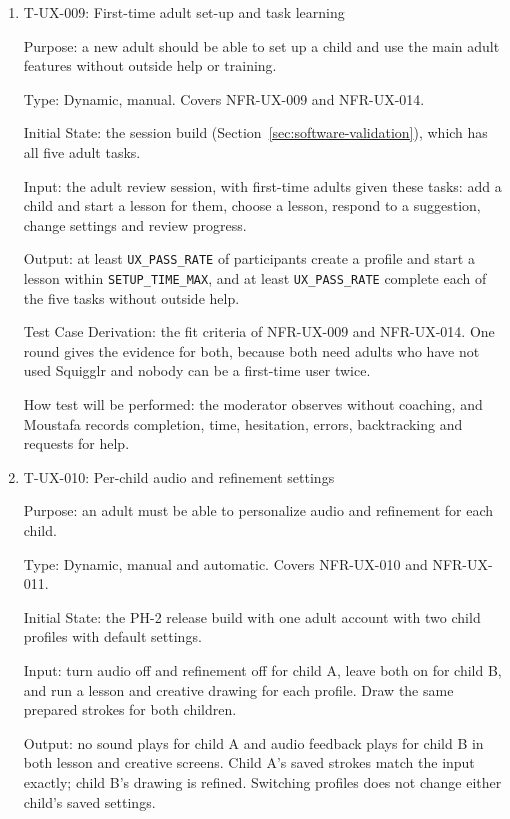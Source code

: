 \documentclass[12pt, titlepage]{article}
\newcommand{\testitem}[1]{\item #1\par\nopagebreak}
\begin{document}
\begin{enumerate}
How test will be performed: the tester records each adult action in each lesson,
and any action other than a response to a suggestion is a finding.

\testitem{T-UX-009: First-time adult set-up and task learning}

Purpose: a new adult should be able to set up a child and use the main adult
features without outside help or training.

Type: Dynamic, manual. Covers NFR-UX-009 and NFR-UX-014.

Initial State: the session build (Section~\ref{sec:software-validation}), which
has all five adult tasks.

Input: the adult review session, with first-time adults given these tasks: add a
child and start a lesson for them, choose a lesson, respond to a suggestion,
change settings and review progress.

Output: at least \texttt{UX\_PASS\_RATE} of participants create a profile
and start a lesson within \texttt{SETUP\_TIME\_MAX}, and at least
\texttt{UX\_PASS\_RATE} complete each of the five tasks without outside help.

Test Case Derivation: the fit criteria of NFR-UX-009 and NFR-UX-014. One round
gives the evidence for both, because both need adults who have not used Squigglr
and nobody can be a first-time user twice.

How test will be performed: the moderator observes without coaching, and
Moustafa records completion, time, hesitation, errors, backtracking and requests
for help.

\testitem{T-UX-010: Per-child audio and refinement settings}

Purpose: an adult must be able to personalize audio and refinement
for each child.

Type: Dynamic, manual and automatic. Covers NFR-UX-010 and NFR-UX-011.

Initial State: the PH-2 release build with one adult account with two 
child profiles with default settings.

Input: turn audio off and refinement off for child A, leave both on for
child B, and run a lesson and creative drawing for each profile. Draw the
same prepared strokes for both children.

Output: no sound plays for child A and audio feedback plays for child B in
both lesson and creative screens. Child A's saved strokes match the input
exactly; child B's drawing is refined. Switching profiles does not change
either child's saved settings.


\end{enumerate}
\end{document}
